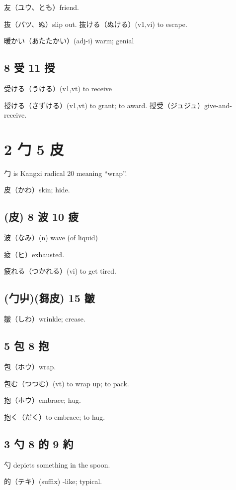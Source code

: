 友（ユウ、とも）friend.

抜（バツ、ぬ）slip out.
抜ける（ぬける）(v1,vi) to escape.

暖かい（あたたかい）(adj-i) warm; genial

\subsection{8 受 11 授}

受ける（うける）(v1,vt) to receive

授ける（さずける）(v1,vt) to grant; to award.
授受（ジュジュ）give-and-receive.

\section{2 勹 5 皮}

勹 is Kangxi radical 20 meaning ``wrap''.

皮（かわ）skin; hide.

\subsection{(皮) 8 波 10 疲}

波（なみ）(n) wave (of liquid)

疲（ヒ）exhausted.

疲れる（つかれる）(vi) to get tired.

\subsection{(勹屮)(芻皮) 15 皺}

皺（しわ）wrinkle; crease.

\subsection{5 包 8 抱}

包（ホウ）wrap.

包む（つつむ）(vt) to wrap up; to pack.

抱（ホウ）embrace; hug.

抱く（だく）to embrace; to hug.

\subsection{3 勺 8 的 9 約}

勺 depicts something in the spoon.

的（テキ）(suffix) -like; typical.

